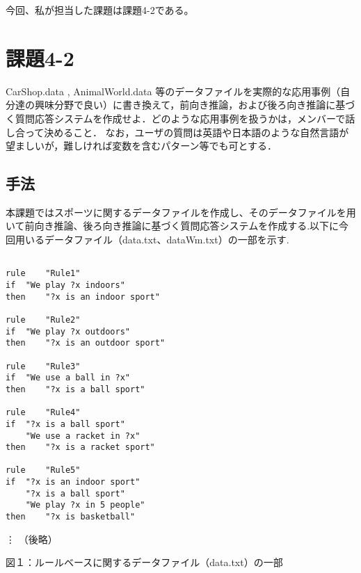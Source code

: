 \documentclass[a4j]{jarticle}
\begin{document}
今回、私が担当した課題は課題4-2である。

\section{課題4-2}
\begin{screen}
CarShop.data , AnimalWorld.data 等のデータファイルを実際的な応用事例（自分達の興味分野で良い）に書き換えて，前向き推論，および後ろ向き推論に基づく質問応答システムを作成せよ．どのような応用事例を扱うかは，メンバーで話し合って決めること．
なお，ユーザの質問は英語や日本語のような自然言語が望ましいが，難しければ変数を含むパターン等でも可とする．

\end{screen}

\subsection{手法}
本課題ではスポーツに関するデータファイルを作成し、そのデータファイルを用いて前向き推論、後ろ向き推論に基づく質問応答システムを作成する.以下に今回用いるデータファイル（data.txt、dataWm.txt）の一部を示す.\\

\begin{screen}
\begin{verbatim}

rule 	"Rule1"
if 	"We play ?x indoors"
then 	"?x is an indoor sport"

rule 	"Rule2"
if 	"We play ?x outdoors"
then 	"?x is an outdoor sport"

rule 	"Rule3"
if 	"We use a ball in ?x"
then 	"?x is a ball sport"

rule 	"Rule4"
if 	"?x is a ball sport"
	"We use a racket in ?x"
then 	"?x is a racket sport"

rule 	"Rule5"
if 	"?x is an indoor sport"
	"?x is a ball sport"
	"We play ?x in 5 people"
then 	"?x is basketball"
\end{verbatim}
\vdots
（後略）

\end{screen}
\begin{center}
図１：ルールベースに関するデータファイル（data.txt）の一部\\
\end{center}
\end{document}
